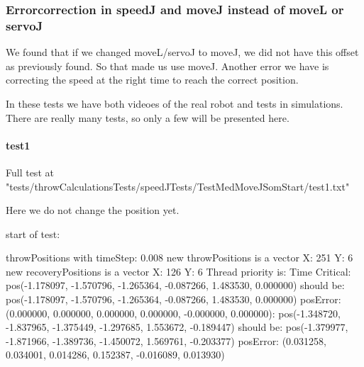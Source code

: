 \subsubsection{Errorcorrection in speedJ and moveJ instead of moveL or servoJ}
We found that if we changed moveL/servoJ to moveJ, we did not have this offset as previously found. So that made us use moveJ.\newline
Another error we have is correcting the speed at the right time to reach the correct position.\newline

In these tests we have both videoes of the real robot and tests in simulations. There are really many tests, so only a few will be presented here.

\paragraph{test1}
Full test at "tests/throwCalculationsTests/speedJTests/TestMedMoveJSomStart/test1.txt"

Here we do not change the position yet. \newline

start of test: \newline 

throwPositions with timeStep:  0.008\newline 
new throwPositions is a vector X: 251 Y:  6\newline 
new recoveryPositions is a vector X: 126 Y:  6\newline 
Thread priority is: Time Critical\newline 
[0.000000s - Step 0/251]:\newline 
\hspace{1cm}        pos(-1.178097, -1.570796, -1.265364, -0.087266, 1.483530, 0.000000) should be:\newline 
\hspace{1cm}         pos(-1.178097, -1.570796, -1.265364, -0.087266, 1.483530, 0.000000)\newline 
\hspace{1cm}         posError: (0.000000, 0.000000, 0.000000, 0.000000, -0.000000, 0.000000)\newline 
[2.000000s - Step 250/251]:\newline 
\hspace{1cm}         pos(-1.348720, -1.837965, -1.375449, -1.297685, 1.553672, -0.189447) should be:\newline 
\hspace{1cm}         pos(-1.379977, -1.871966, -1.389736, -1.450072, 1.569761, -0.203377)\newline 
\hspace{1cm}         posError: (0.031258, 0.034001, 0.014286, 0.152387, -0.016089, 0.013930)\newline 

